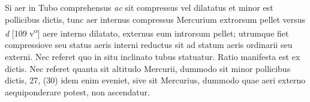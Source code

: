  \pstart {} Si aer in Tubo comprehensus \textit{ac} sit compressus vel dilatatus et  minor est pollicibus dictis, tunc aer internus compressus Mercurium\protect{} extrorsum pellet versus \textit{d} 
 [109 v\textsuperscript{o}] aere interno dilatato, externus eum introrsum pellet; utrumque fiet   compressiove\protect{} seu status aeris interni reductus sit ad statum aeris ordinarii seu externi. Nec referet quo in situ  inclinato tubus statuatur. Ratio manifesta est ex dictis. Nec referet  quanta sit altitudo Mercurii\protect{}, dummodo sit minor pollicibus dictis, 27, (30) idem enim eveniet, sive  sit Mercurius\protect{}, dummodo  quae aeri externo aequiponderare potest, non ascendatur.
 \pend
